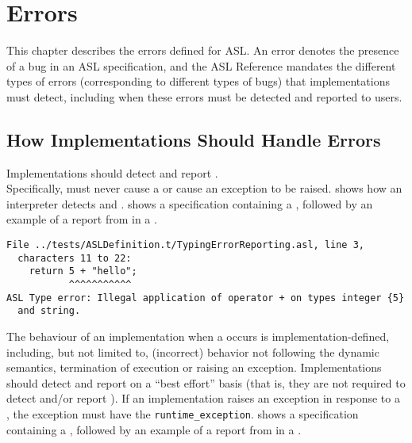\chapter{Errors\label{chap:Errors}}

This chapter describes the errors defined for ASL.
%
An error denotes the presence of a bug in an ASL specification,
and the ASL Reference mandates the different types of errors
(corresponding to different types of bugs) that implementations must detect,
including when these errors must be detected and reported to users.

\section{How Implementations Should Handle Errors}

 Implementations should detect and report \staticerrorsterm. \\
Specifically, \staticerrorsterm{} must never cause a \dynamicerrorterm{} or
cause an exception to be raised.
%
 shows how an interpreter detects \builderrorsterm{}
and \typingerrorsterm{}.
%
 shows a specification containing a \typingerrorterm,
followed by an example of a report from \aslref{} in a \linuxbashshell.

\begin{Verbatim}[fontsize=\footnotesize, frame=single]
File ../tests/ASLDefinition.t/TypingErrorReporting.asl, line 3,
  characters 11 to 22:
    return 5 + "hello";
           ^^^^^^^^^^^
ASL Type error: Illegal application of operator + on types integer {5}
  and string.
\end{Verbatim}

 The behaviour of an implementation when a \dynamicerrorterm{}
occurs is implementation-defined, including, but not limited to,
(incorrect) behavior not following the dynamic semantics, termination of execution or raising an exception.
%
Implementations should detect and report \dynamicerrorsterm{} on a ``best effort'' basis
(that is, they are not required to detect and/or report \dynamicerrorsterm{}).
%
If an implementation raises an exception in response to a \dynamicerrorterm{},
the exception must have the \supertypeterm{}
\verb|runtime_exception|.
%
 shows a specification containing a \dynamicerrorterm{},
followed by an example of a report from \aslref{} in a \linuxbashshell.

